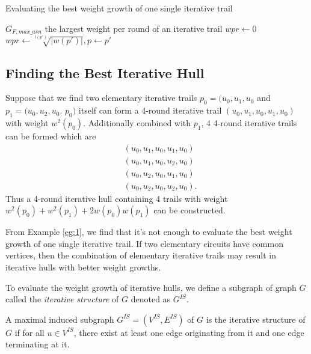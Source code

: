 \begin{algorithm}
	\caption{Evaluating the best weight growth of one single iterative trail}
	\label{algo:1}
	\begin{algorithmic}[1]
		\Require $G_{F,max\_asn}$
		\Ensure the largest weight per round of an iterative trail
		\Procedure {}{}
		\State $wpr\leftarrow 0$
		\State $wpr\leftarrow \sqrt[l(p')]{|w(p')|},p\leftarrow p'$
		\EndIf
		\EndFor
		\State {}
		\EndProcedure
	\end{algorithmic}
\end{algorithm}

\subsection{Finding the Best Iterative Hull}\label{sec:fbih}

\begin{example}\label{eg:1}
	Suppose that we find two elementary iterative trails $p_0=(u_0,u_1,u_0$ and $p_1=(u_0,u_2 ,u_0$. $p_0)$ itself can form a 4-round iterative trail $(u_0,u_1,u_0,u_1,u_0)$ with weight $w^2(p_0)$. Additionally combined with $p_1$, 4 4-round iterative trails can be formed which are
	\begin{align*}
		&(u_0,u_1,u_0,u_1,u_0)\\
		&(u_0,u_1,u_0,u_2,u_0)\\
		&(u_0,u_2,u_0,u_1,u_0)\\
		&(u_0,u_2,u_0,u_2,u_0).
	\end{align*}
	Thus a 4-round iterative hull containing 4 trails with weight $w^2(p_0)+w^2(p_1)+2w(p_0)w(p_1)$ can be constructed.
\end{example}

From Example \ref{eg:1}, we find that it's not enough to evaluate the best weight growth of one single iterative trail. If two elementary circuits have common vertices, then the combination of elementary iterative trails may result in iterative hulls with better weight growths.  

To evaluate the weight growth of iterative hulls, we define a subgraph of graph $G$ called the \textit{iterative structure} of $G$ denoted as $G^{IS}$. 

\begin{definition}
	A maximal induced subgraph $G^{IS}=(V^{IS},E^{IS})$ of $G$ is the iterative structure of $G$ if for all $u\in V^{IS}$, there exist at least one edge originating from it and one edge terminating at it.
\end{definition}

